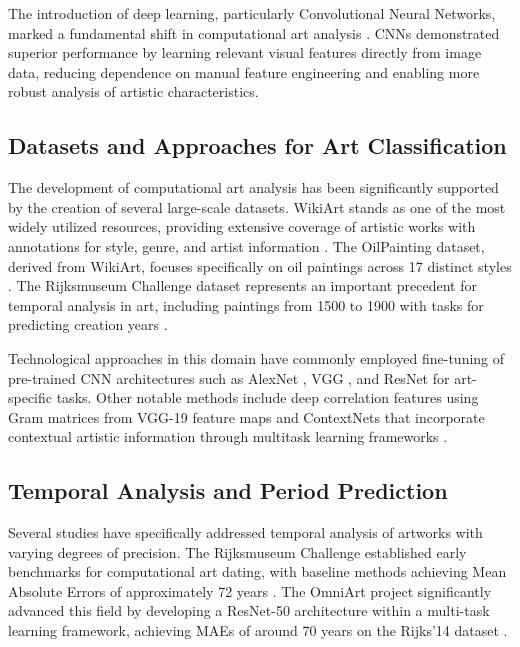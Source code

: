 \documentclass[10pt,twocolumn,letterpaper]{article}
\begin{document}
The introduction of deep learning, particularly Convolutional Neural Networks, marked a fundamental shift in computational art analysis \cite{Tan16, Elgammal18}. CNNs demonstrated superior performance by learning relevant visual features directly from image data, reducing dependence on manual feature engineering and enabling more robust analysis of artistic characteristics.

\subsection{Datasets and Approaches for Art Classification}

The development of computational art analysis has been significantly supported by the creation of several large-scale datasets. WikiArt stands as one of the most widely utilized resources, providing extensive coverage of artistic works with annotations for style, genre, and artist information \cite{Karayev14, Cetinic21}. The OilPainting dataset, derived from WikiArt, focuses specifically on oil paintings across 17 distinct styles \cite{Chu18}. The Rijksmuseum Challenge dataset represents an important precedent for temporal analysis in art, including paintings from 1500 to 1900 with tasks for predicting creation years \cite{Mensink14}.

Technological approaches in this domain have commonly employed fine-tuning of pre-trained CNN architectures such as AlexNet \cite{Tan16}, VGG \cite{Seguin16}, and ResNet \cite{Strezoski17OmniArt} for art-specific tasks. Other notable methods include deep correlation features using Gram matrices from VGG-19 feature maps \cite{Chu18} and ContextNets that incorporate contextual artistic information through multitask learning frameworks \cite{Garcia20ContextNet}.

\subsection{Temporal Analysis and Period Prediction}

Several studies have specifically addressed temporal analysis of artworks with varying degrees of precision. The Rijksmuseum Challenge established early benchmarks for computational art dating, with baseline methods achieving Mean Absolute Errors of approximately 72 years \cite{Mensink14}. The OmniArt project significantly advanced this field by developing a ResNet-50 architecture within a multi-task learning framework, achieving MAEs of around 70 years on the Rijks'14 dataset \cite{Strezoski18}.
\end{document}
